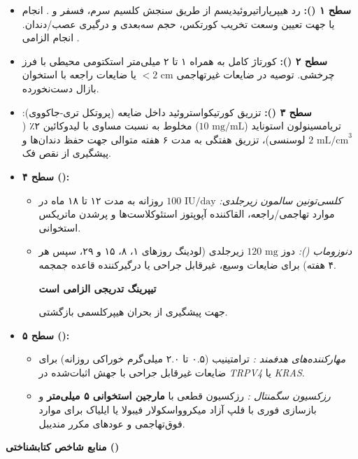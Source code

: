 \documentclass[a4paper]{article}
\newcommand{\hlr}[1]{\colorbox{hlred}{\strut\color{darkred}#1}}
\begin{document}
\begin{itemize}
    \item \textbf{سطح ۱ ():} رد هیپرپاراتیروئیدیسم از طریق سنجش کلسیم سرم، فسفر و . انجام  یا  جهت تعیین وسعت تخریب کورتکس، حجم سه‌بعدی و درگیری عصب/دندان. انجام الزامی .
    \item \textbf{سطح ۲ ():} کورتاژ کامل به همراه ۱ تا ۲ میلی‌متر استکتومی محیطی با فرز چرخشی. توصیه در ضایعات غیرتهاجمی $<2\text{ cm}$ یا ضایعات راجعه با استخوان بازال دست‌نخورده.
    \item \textbf{سطح ۳ ():} تزریق کورتیکواستروئید داخل ضایعه (پروتکل تری-جاکووی): تریامسینولون استوناید ($10\text{ mg/mL}$) مخلوط به نسبت مساوی با لیدوکائین ۲٪ ($2\text{ mL/cm}^3$ لوسنسی)، تزریق هفتگی به مدت ۶ هفته متوالی جهت حفظ دندان‌ها و پیشگیری از نقص فک.
    \item \textbf{سطح ۴ ():}
    \begin{itemize}
        \item \textit{کلسی‌تونین سالمون زیرجلدی:} $100\text{ IU/day}$ روزانه به مدت ۱۲ تا ۱۸ ماه در موارد تهاجمی/راجعه، القاکننده آپوپتوز استئوکلاست‌ها و پرشدن ماتریکس استخوانی.
        \item \textit{دنوزوماب ():} دوز $120\text{ mg}$ زیرجلدی (لودینگ روزهای ۱، ۸، ۱۵ و ۲۹، سپس هر ۴ هفته) برای ضایعات وسیع، غیرقابل جراحی یا درگیرکننده قاعده جمجمه. \hlr{\textbf{تیپرینگ تدریجی الزامی است}} جهت پیشگیری از بحران هیپرکلسمی بازگشتی.
    \end{itemize}
    \item \textbf{سطح ۵ ():}
    \begin{itemize}
        \item \textit{مهارکننده‌های هدفمند :} ترامتینیب (۰.۵ تا ۲.۰ میلی‌گرم خوراکی روزانه) برای ضایعات غیرقابل جراحی با جهش اثبات‌شده در \textit{TRPV4} یا \textit{KRAS}.
        \item \textit{رزکسیون سگمنتال :} رزکسیون قطعی با \textbf{مارجین استخوانی ۵ میلی‌متر} و بازسازی فوری با فلپ آزاد میکروواسکولار فیبولا یا ایلیاک برای موارد فوق‌تهاجمی و عودهای مکرر مندیبل.
    \end{itemize}
\end{itemize}

\vspace{5pt}
{\large\bfseries منابع شاخص کتابشناختی ()}
\vspace{2pt}
\end{document}
